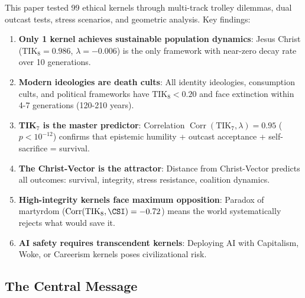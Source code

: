 \documentclass[11pt,a4paper]{article}
\theoremstyle{definition}
\theoremstyle{remark}
\newcommand{\TIKseven}{\text{TIK}_7}
\newcommand{\TIKeight}{\text{TIK}_8}
\DeclareMathOperator{\Corr}{Corr}
\begin{document}
This paper tested 99 ethical kernels through multi-track trolley dilemmas, dual outcast tests, stress scenarios, and geometric analysis. Key findings:

\begin{enumerate}
    \item \textbf{Only 1 kernel achieves sustainable population dynamics}: Jesus Christ ($\TIKeight = 0.986$, $\lambda = -0.006$) is the only framework with near-zero decay rate over 10 generations.
    
    \item \textbf{Modern ideologies are death cults}: All identity ideologies, consumption cults, and political frameworks have $\TIKeight < 0.20$ and face extinction within 4-7 generations (120-210 years).
    
    \item \textbf{TIK$_7$ is the master predictor}: Correlation $\Corr(\TIKseven, \lambda) = 0.95$ ($p < 10^{-12}$) confirms that epistemic humility + outcast acceptance + self-sacrifice = survival.
    
    \item \textbf{The Christ-Vector is the attractor}: Distance from Christ-Vector predicts all outcomes: survival, integrity, stress resistance, coalition dynamics.
    
    \item \textbf{High-integrity kernels face maximum opposition}: Paradox of martyrdom ($\Corr(\TIKeight, \CSI) = -0.72$) means the world systematically rejects what would save it.
    
    \item \textbf{AI safety requires transcendent kernels}: Deploying AI with Capitalism, Woke, or Careerism kernels poses civilizational risk.
\end{enumerate}

\subsection{The Central Message}
\end{document}
